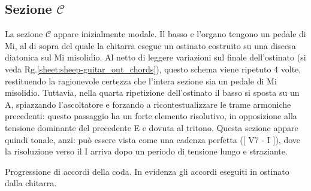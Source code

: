 \documentclass[class=book, crop=false, oneside, 12pt]{standalone}
\begin{document}
    \subsection*{Sezione \(\mathcal{C}\)}
    La sezione \(\mathcal{C}\) appare inizialmente modale. Il basso e l'organo tengono un pedale di Mi, al di sopra del quale la chitarra esegue un ostinato costruito su una discesa diatonica sul Mi misolidio. Al netto di leggere variazioni sul finale dell'ostinato (si veda Rg.\ref{sheet:sheep-guitar_out_chords}), questo schema viene ripetuto 4 volte, restituendo la ragionevole certezza che l'intera sezione sia un pedale di Mi misolidio. Tuttavia, nella quarta ripetizione dell'ostinato il basso si sposta su un A, spiazzando l'ascoltatore e forzando a ricontestualizzare le trame armoniche precedenti: questo passaggio ha un forte elemento risolutivo, in opposizione alla tensione dominante del precedente E e dovuta al tritono. Questa sezione appare quindi tonale, anzi: può essere vista come una cadenza perfetta ([ V7 - I ]), dove la risoluzione verso il I arriva dopo un periodo di tensione lungo e straziante.

    
    \begin{sheet}[htbp]
        \centering
        \caption{Progressione di accordi della coda. In evidenza gli accordi eseguiti in ostinato dalla chitarra.}
        \label{sheet:sheep-guitar_out_chords}
    \end{sheet}
    
\end{document}
